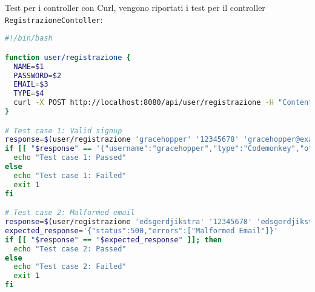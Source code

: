 Test per i controller con Curl, vengono riportati i test per il controller \texttt{RegistrazioneContoller}:

\begin{lstlisting}[language=bash]
#!/bin/bash

function user/registrazione {
  NAME=$1
  PASSWORD=$2
  EMAIL=$3
  TYPE=$4
  curl -X POST http://localhost:8080/api/user/registrazione -H "Content-Type: application/json" -d "{\"registrazione\": {\"username\": \"$NAME\", \"email\": \"$EMAIL\", \"password\": \"$PASSWORD\", \"type\": \"$TYPE\" }}"
}

# Test case 1: Valid signup
response=$(user/registrazione 'gracehopper' '12345678' 'gracehopper@example.com' 'Codemonkey')
if [[ "$response" == '{"username":"gracehopper","type":"Codemonkey","otp_provisioning_uri":"otpauth://totp/gracehopper?secret='*'"}' ]]; then
  echo "Test case 1: Passed"
else
  echo "Test case 1: Failed"
  exit 1
fi

# Test case 2: Malformed email
response=$(user/registrazione 'edsgerdjikstra' '12345678' 'edsgerdjikstra@malformedemail' 'Codemonkey')
expected_response='{"status":500,"errors":["Malformed Email"]}'
if [[ "$response" == "$expected_response" ]]; then
  echo "Test case 2: Passed"
else
  echo "Test case 2: Failed"
  exit 1
fi
\end{lstlisting}